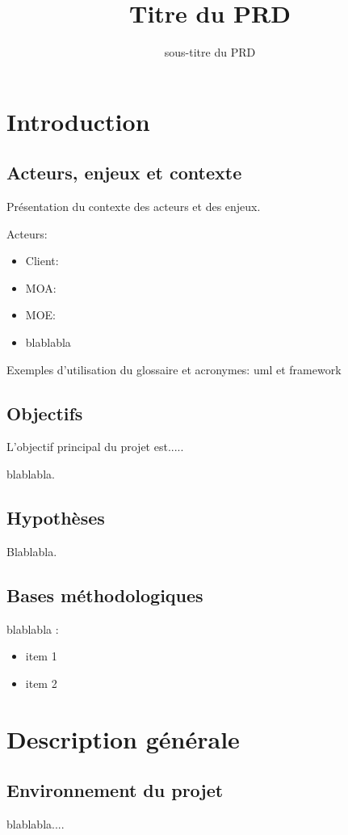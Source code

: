 \documentclass{polytech/polytech}
\title{Titre du PRD}
\subtitle{sous-titre du PRD}
\numberwithin{figure}{chapter}
\begin{document}
             
\chapter{Introduction}
\section{Acteurs, enjeux et contexte}

Présentation du contexte des acteurs et des enjeux.

Acteurs:
\begin{itemize}
\item Client: 
\item MOA:
\item MOE:  
\item blablabla
\end{itemize}

Exemples d'utilisation du glossaire et acronymes:
\gls{uml} et \gls{framework}


\section{Objectifs}

L'objectif principal du projet est.....

blablabla.
 

\section{Hypothèses}

Blablabla.

\section{Bases méthodologiques}

blablabla :
\begin{itemize}
\item item 1
\item item 2
\end{itemize}

\chapter{Description générale}
\section{Environnement du projet}

blablabla.... 
\end{document}
